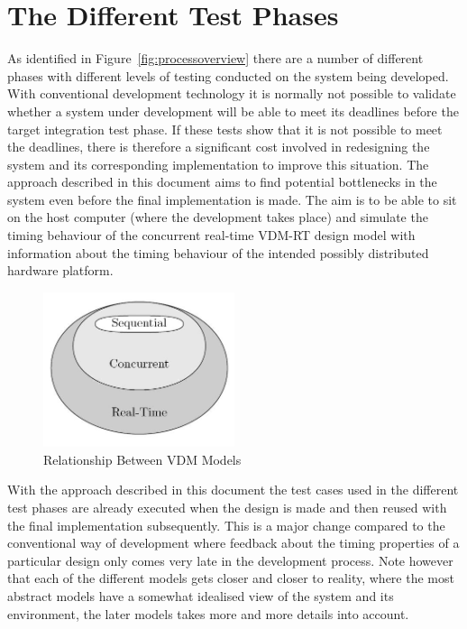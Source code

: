 \documentclass{overturerepchap}
\begin{document}
\section{The Different Test Phases}\label{sec:tests}

As identified in Figure~\ref{fig:processoverview} there are a number
of different phases with different levels of testing conducted on the
system being developed. With conventional development technology it is
normally not possible to validate whether a system under development
will be able to meet its deadlines before the target integration test
phase. If these tests show that it is not possible to meet the
deadlines, there is therefore a significant cost involved in
redesigning the system and its corresponding implementation to improve
this situation. The approach described in this document aims to find
potential bottlenecks in the system even before the final
implementation is made. The aim is to be able to sit on the host
computer (where the development takes place) and simulate the timing
behaviour of the concurrent real-time VDM-RT design model with
information about the timing behaviour of the intended possibly
distributed hardware platform.

\begin{figure}
\begin{center}
\includegraphics[width=0.5\textwidth]{figures/VDM++levelsofmodels.jpg}
\end{center}
\caption{Relationship Between VDM Models}\label{fig:relationship}
\end{figure}

With the approach described in this document the test cases used in
the different test phases are already executed when the design is made
and then reused with the final implementation subsequently. This is a
major change compared to the conventional way of development where
feedback about the timing properties of a particular design only comes
very late in the development process. Note however that each of the different
models gets closer and closer to reality, where the most abstract models
have a somewhat idealised view of the system and its environment, the later
models takes more and more details into account.
\end{document}
